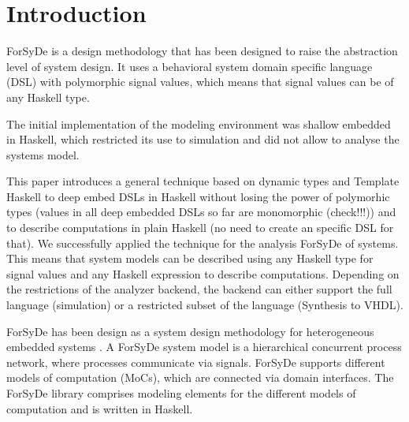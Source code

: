\section{Introduction}
\label{sec:Introduction}

ForSyDe is a design methodology that has been designed to raise the abstraction level of system design. It uses a behavioral system domain specific language (DSL) with polymorphic signal values, which means that signal values can be of any Haskell type.
 
The initial implementation of the modeling environment was shallow embedded in Haskell, which restricted its use to simulation and did not allow to analyse the systems model. 

This paper introduces a general technique based on dynamic types and Template
Haskell \cite{} to deep embed DSLs in Haskell without losing the power
of polymorhic types (values in all deep embedded DSLs so far are
monomorphic (check!!!)) and to describe computations in plain Haskell
(no need to create an specific DSL for that). We successfully applied
the technique for the analysis ForSyDe of systems. This means that
system models can be described using any Haskell type for signal
values and any Haskell expression to describe computations. Depending
on the restrictions of the analyzer backend, the backend can either
support the full language (simulation) or a restricted subset of the
language (Synthesis to VHDL). 


ForSyDe has been design as a system design methodology for heterogeneous embedded systems \cite{SanJan2004a}. A ForSyDe system model is a hierarchical concurrent process network, where processes communicate via signals. ForSyDe supports different models of computation (MoCs), which are connected via domain interfaces. The ForSyDe library comprises modeling elements for the different models of computation and is written in Haskell. 




\cite{BjeCla1998}

